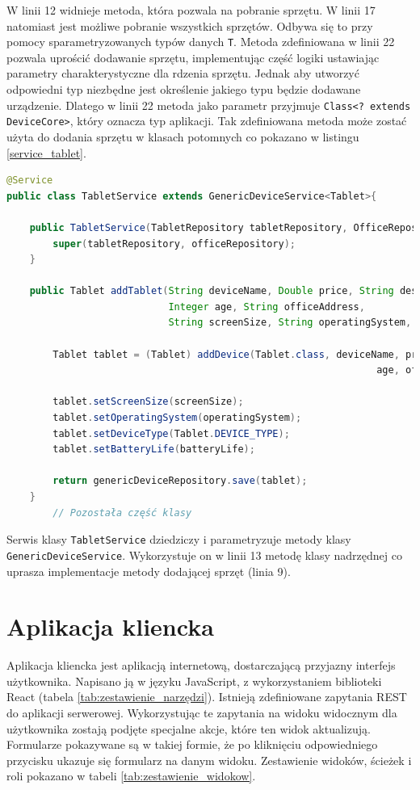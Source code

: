 W linii 12 widnieje metoda, która pozwala na pobranie sprzętu. W linii 17 natomiast jest możliwe pobranie wszystkich sprzętów. Odbywa się to przy pomocy sparametryzowanych typów danych \texttt{T}. Metoda zdefiniowana w linii 22 pozwala uprościć dodawanie sprzętu, implementując część logiki ustawiając parametry charakterystyczne dla rdzenia sprzętu. Jednak aby utworzyć odpowiedni typ niezbędne jest określenie jakiego typu będzie dodawane urządzenie. Dlatego w linii 22 metoda jako parametr przyjmuje \texttt{Class<? extends DeviceCore>}, który oznacza typ aplikacji. Tak zdefiniowana metoda może zostać użyta do dodania sprzętu w klasach potomnych co pokazano w listingu \ref{service_tablet}.

\begin{lstlisting}[language=Java, style=JavaStyle,  caption={Klasa potomna serwisu tabletu: TabletService }, label={service_tablet}]
@Service
public class TabletService extends GenericDeviceService<Tablet>{

    public TabletService(TabletRepository tabletRepository, OfficeRepository officeRepository){
        super(tabletRepository, officeRepository);
    }

    public Tablet addTablet(String deviceName, Double price, String description,
                            Integer age, String officeAddress,
                            String screenSize, String operatingSystem, String batteryLife){

        Tablet tablet = (Tablet) addDevice(Tablet.class, deviceName, price, description,
                                                                age, officeAddress);

        tablet.setScreenSize(screenSize);
        tablet.setOperatingSystem(operatingSystem);
        tablet.setDeviceType(Tablet.DEVICE_TYPE);
        tablet.setBatteryLife(batteryLife);

        return genericDeviceRepository.save(tablet);
    }
		// Pozostała część klasy
\end{lstlisting}

Serwis klasy \texttt{TabletService} dziedziczy i parametryzuje metody klasy \texttt{GenericDeviceService}. Wykorzystuje on w linii 13 metodę klasy nadrzędnej co uprasza implementacje metody dodającej sprzęt (linia 9).

\section {Aplikacja kliencka}
Aplikacja kliencka jest aplikacją internetową, dostarczającą przyjazny interfejs użytkownika. Napisano ją w języku JavaScript, z wykorzystaniem biblioteki React (tabela \ref{tab:zestawienie_narzędzi}). Istnieją zdefiniowane zapytania REST do aplikacji serwerowej. Wykorzystując te zapytania na widoku widocznym dla użytkownika zostają podjęte specjalne akcje, które ten widok aktualizują. Formularze pokazywane są w takiej formie, że po kliknięciu odpowiedniego przycisku ukazuje się formularz na danym widoku. Zestawienie widoków, ścieżek i roli pokazano w tabeli \ref{tab:zestawienie_widokow}.

